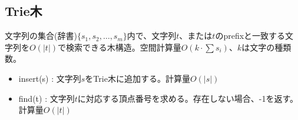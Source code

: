 \subsection{Trie木}

文字列の集合(辞書)$\{s_1, s_2, \ldots, s_m \}$内で、文字列$t$、または$t$のprefixと一致する文字列を$O(|t|)$で検索できる木構造。空間計算量$O(k \cdot \sum{s_i})$、$k$は文字の種類数。

\begin{itemize}
    \item insert(s) : 文字列$s$をTrie木に追加する。計算量$O(|s|)$
    \item find(t) : 文字列$t$に対応する頂点番号を求める。存在しない場合、-1を返す。計算量$O(|t|)$
\end{itemize}

